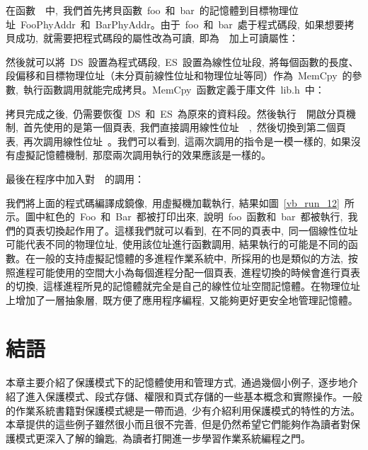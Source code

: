 
在函數~~中,~我們首先拷貝函數~foo~和~bar~的記憶體到目標物理位址~FooPhyAddr~和~BarPhyAddr。由于~foo~和~bar~處于程式碼段,~如果想要拷貝成功,~就需要把程式碼段的屬性改為可讀,~即為~~加上可讀屬性：


然後就可以將~DS~設置為程式碼段,~ES~設置為線性位址段,~將每個函數的長度、段偏移和目標物理位址（未分頁前線性位址和物理位址等同）作為~MemCpy~的參數,~執行函數調用就能完成拷貝。MemCpy~函數定義于庫文件~lib.h~中：


拷貝完成之後,~仍需要恢復~DS~和~ES~為原來的資料段。然後執行~~開啟分頁機制,~首先使用的是第一個頁表,~我們直接調用線性位址~~,~然後切換到第二個頁表,~再次調用線性位址~。我們可以看到,~這兩次調用的指令是一模一樣的,~如果沒有虛擬記憶體機制,~那麼兩次調用執行的效果應該是一樣的。

最後在程序中加入對~~的調用：



我們將上面的程式碼編譯成鏡像,~用虛擬機加載執行,~結果如圖~\ref{vb_run_12}~所示。圖中紅色的~Foo~和~Bar~都被打印出來,~說明~foo~函數和~bar~都被執行,~我們的頁表切換起作用了。這樣我們就可以看到,~在不同的頁表中,~同一個線性位址可能代表不同的物理位址,~使用該位址進行函數調用,~結果執行的可能是不同的函數。在一般的支持虛擬記憶體的多進程作業系統中,~所採用的也是類似的方法,~按照進程可能使用的空間大小為每個進程分配一個頁表,~進程切換的時候會進行頁表的切換,~這樣進程所見的記憶體就完全是自己的線性位址空間記憶體。在物理位址上增加了一層抽象層,~既方便了應用程序編程,~又能夠更好更安全地管理記憶體。

\section{結語}

本章主要介紹了保護模式下的記憶體使用和管理方式,~通過幾個小例子,~逐步地介紹了進入保護模式、段式存儲、權限和頁式存儲的一些基本概念和實際操作。一般的作業系統書籍對保護模式總是一帶而過,~少有介紹利用保護模式的特性的方法。本章提供的這些例子雖然很小而且很不完善,~但是仍然希望它們能夠作為讀者對保護模式更深入了解的鑰匙,~為讀者打開進一步學習作業系統編程之門。
